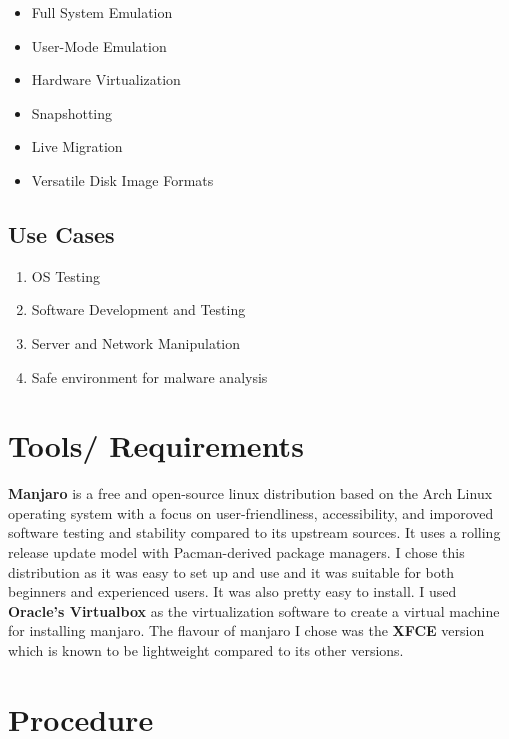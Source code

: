 \documentclass[a4paper,12pt]{report}
\begin{document}
\begin{itemize}
    \item Full System Emulation
    \item User-Mode Emulation
    \item Hardware Virtualization
    \item Snapshotting
    \item Live Migration
    \item Versatile Disk Image Formats
\end{itemize}
\subsection{Use Cases}
    \begin{enumerate}
        \item OS Testing
        \item Software Development and Testing
        \item Server and Network Manipulation
        \item Safe environment for malware analysis
    \end{enumerate}


\section{Tools/ Requirements}
\textbf{Manjaro} is a free and open-source linux distribution based on the Arch Linux operating system with a focus on user-friendliness, accessibility, and imporoved software testing and stability compared to its upstream sources. It uses a rolling release update model with Pacman-derived package managers. 
\newline
I chose this distribution as it was easy to set up and use and it was suitable for both beginners and experienced users. It was also pretty easy to install.
\newline
I used \textbf{Oracle’s Virtualbox} as the virtualization software to create a virtual machine for installing manjaro. The flavour of manjaro I chose was the \textbf{XFCE} version which is known to be lightweight compared to its other versions.
\section{Procedure}
\end{document}
